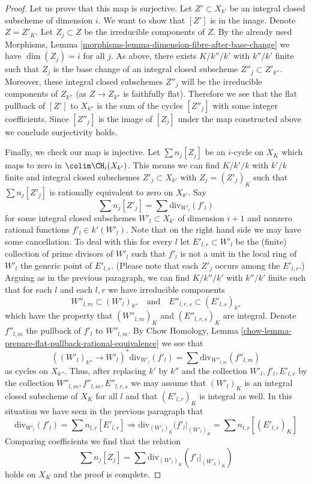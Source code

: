 \begin{proof}
\medskip\noindent
Let us prove that this map is surjective. Let $Z' \subset X_{k'}$
be an integral closed subscheme of dimension $i$.
We want to show that $[Z']$ is in the image.
Denote $Z = Z'_K$. Let $Z_j \subset Z$ be the irreducible
components of $Z$. By the already used
Morphisms, Lemma \ref{morphisms-lemma-dimension-fibre-after-base-change}
we have $\dim(Z_j) = i$ for all $j$. As above, there exists
$K/k''/k'$ with $k''/k'$ finite such that $Z_j$ is the base change
of an integral closed subscheme $Z''_j \subset Z'_{k''}$.
Moreover, these integral closed subschemes $Z''_j$ will be the irreducible
components of $Z_{k''}$ (as $Z \to Z_{k''}$ is faithfully flat).
Therefore we see that the flat pullback of $[Z']$ to $X_{k''}$
is the sum of the cycles $[Z''_j]$ with some integer coefficients.
Since $[Z''_j]$ is the image of $[Z_j]$ under the map constructed
above we conclude surjectivity holds.

\medskip\noindent
Finally, we check our map is injective. Let $\sum n_j [Z_j]$
be an $i$-cycle on $X_K$ which maps to zero in $\colim \CH_i(X_{k'})$.
This means we can find $K/k'/k$ with $k'/k$ finite and
integral closed subschemes $Z'_j \subset X_{k'}$ with
$Z_j = (Z'_j)_K$ such that $\sum n_j[Z'_j]$ is rationally
equivalent to zero on $X_{k'}$. Say
$$
\sum n_j[Z'_j] = \sum \text{div}_{W'_l}(f'_l)
$$
for some integral closed subschemes $W'_l \subset X_{k'}$ of dimension $i + 1$
and nonzero rational functions $f'_l \in k'(W'_l)$.
Note that on the right hand side we may have some cancellation.
To deal with this for every $l$ let $E'_{l, r} \subset W'_l$
be the (finite) collection of prime divisors of $W'_l$
such that $f'_l$ is not a unit in the local ring of $W'_l$ the generic
point of $E'_{l, r}$. (Please note that each $Z'_j$ occurs among
the $E'_{l, r}$.)
Arguing as in the previous paragraph, we can find $K/k''/k'$ with
$k''/k'$ finite such that for each $l$ and each $l, r$ we have
irreducible components
$$
W''_{l, m} \subset (W'_l)_{k''}
\quad\text{and}\quad
E''_{l, r, s} \subset (E'_{l, s})_{k''}
$$
which have the property that $(W''_{l, m})_K$ and
$(E''_{l, r, s})_K$ are integral.
Denote $f''_{l, m}$ the pullback of $f'_l$ to $W''_{l, m}$. By
Chow Homology, Lemma
\ref{chow-lemma-prepare-flat-pullback-rational-equivalence} we see that
$$
((W'_l)_{k''} \to W'_l)^* \text{div}_{W'_l}(f'_l)
=
\sum \text{div}_{W''_{l, m}}(f''_{l, m})
$$
as cycles on $X_{k''}$. Thus, after replacing $k'$ by $k''$ and
the collection $W'_l, f'_l, E'_{l, r}$
by the collection $W''_{l, m}, f''_{l, m}, E''_{l, r, s}$
we may assume that $(W'_l)_K$ is an integral closed subscheme of
$X_K$ for all $l$ and that $(E'_{l, r})_K$ is integral as well.
In this situation we have seen in the previous paragraph that
$$
\text{div}_{W'_l}(f'_l) = \sum n_{l, r} [E'_{l, r}]
\Rightarrow
\text{div}_{(W'_l)_K}(f'_l|_{(W'_l)_K} =
\sum n_{l, r} [(E'_{l, r})_K]
$$
Comparing coefficients we find that the relation
$$
\sum n_j[Z_j] = \sum \text{div}_{(W'_l)_K}(f'_l|_{(W'_k)_K})
$$
holds on $X_K$ and the proof is complete.
\end{proof}

